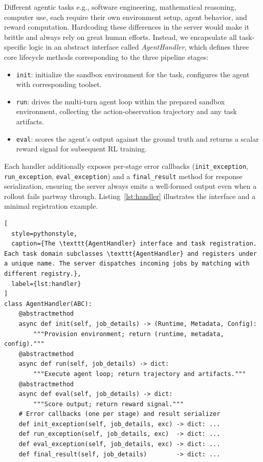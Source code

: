 Different agentic tasks e.g., software engineering, mathematical reasoning, computer use, each require their own environment setup, agent behavior, and reward computation.
Hardcoding these differences in the server would make it brittle and always rely on great human efforts.
Instead, we encapsulate all task-specific logic in an abstract interface called \emph{AgentHandler}, which defines three core lifecycle methods corresponding to the three pipeline stages:

\begin{itemize}
  \item \texttt{init}: initialize the sandbox environment for the task, configures the agent with corresponding toolset.
  \item \texttt{run}: drives the multi-turn agent loop within the prepared sandbox environment, collecting the action-observation trajectory and any task artifacts.
  \item \texttt{eval}: scores the agent's output against the ground truth and returns a scalar reward signal for subsequent RL training.
\end{itemize}

Each handler additionally exposes per-stage error callbacks (\texttt{init\_exception}, \texttt{run\_exception}, \texttt{eval\_exception}) and a \texttt{final\_result} method for response serialization, ensuring the server always emits a well-formed output even when a rollout fails partway through.
Listing~\ref{lst:handler} illustrates the interface and a minimal registration example.

\begin{lstlisting}[
  style=pythonstyle,
  caption={The \texttt{AgentHandler} interface and task registration. Each task domain subclasses \texttt{AgentHandler} and registers under a unique name. The server dispatches incoming jobs by matching with different registry.},
  label={lst:handler}
]
class AgentHandler(ABC):
    @abstractmethod
    async def init(self, job_details) -> (Runtime, Metadata, Config):
        """Provision environment; return (runtime, metadata, config)."""
    @abstractmethod
    async def run(self, job_details) -> dict:
        """Execute agent loop; return trajectory and artifacts."""
    @abstractmethod
    async def eval(self, job_details) -> dict:
        """Score output; return reward signal."""
    # Error callbacks (one per stage) and result serializer
    def init_exception(self, job_details, exc) -> dict: ...
    def run_exception(self, job_details, exc)  -> dict: ...
    def eval_exception(self, job_details, exc) -> dict: ...
    def final_result(self, job_details)        -> dict: ...
\end{lstlisting}

